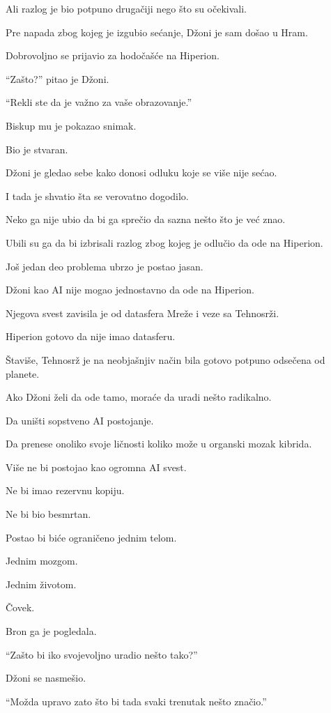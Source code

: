 Ali razlog je bio potpuno drugačiji nego što su očekivali.

Pre napada zbog kojeg je izgubio sećanje, Džoni je sam došao u Hram.

Dobrovoljno se prijavio za hodočašće na Hiperion.

``Zašto?'' pitao je Džoni.

``Rekli ste da je važno za vaše obrazovanje.''

Biskup mu je pokazao snimak.

Bio je stvaran.

Džoni je gledao sebe kako donosi odluku koje se više nije sećao.

I tada je shvatio šta se verovatno dogodilo.

Neko ga nije ubio da bi ga sprečio da sazna nešto što je već znao.

Ubili su ga da bi izbrisali razlog zbog kojeg je odlučio da ode na Hiperion.

\bigskip

Još jedan deo problema ubrzo je postao jasan.

Džoni kao AI nije mogao jednostavno da ode na Hiperion.

Njegova svest zavisila je od datasfera Mreže i veze sa Tehnosrži.

Hiperion gotovo da nije imao datasferu.

Štaviše, Tehnosrž je na neobjašnjiv način bila gotovo potpuno odsečena od planete.

Ako Džoni želi da ode tamo, moraće da uradi nešto radikalno.

Da uništi sopstveno AI postojanje.

Da prenese onoliko svoje ličnosti koliko može u organski mozak kibrida.

Više ne bi postojao kao ogromna AI svest.

Ne bi imao rezervnu kopiju.

Ne bi bio besmrtan.

Postao bi biće ograničeno jednim telom.

Jednim mozgom.

Jednim životom.

Čovek.

Bron ga je pogledala.

``Zašto bi iko svojevoljno uradio nešto tako?''

Džoni se nasmešio.

``Možda upravo zato što bi tada svaki trenutak nešto značio.''

